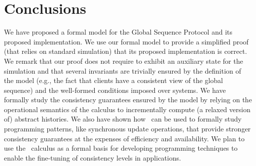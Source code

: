 
\section{Conclusions}
We have proposed a formal model for 
the Global Sequence Protocol and its proposed implementation. We use our formal model 
to provide  a 
simplified proof (that relies on standard  simulation) that its proposed implementation is 
correct. 
We remark that our proof does not require to exhibit an auxiliary state for the simulation  and 
that several 
invariants are trivially ensured by the definition of the model (e.g., the fact that clients have
a consistent view of the global sequence) and the well-formed conditions imposed over systems.  
We have formally study the consistency guarantees ensured by the model by relying on the 
 operational semantics of the calculus to incrementally compute (a relaxed version of) 
abstract histories. We also have shown how  \gsp\ can be used to formally study programming patterns, 
like synchronous update operations, that provide stronger consistency guarantees at the expenses of efficiency 
and availability. We plan to use the \gsp\ calculus as a formal basis for 
developing programming techniques to enable the fine-tuning of consistency levels 
in applications. 
